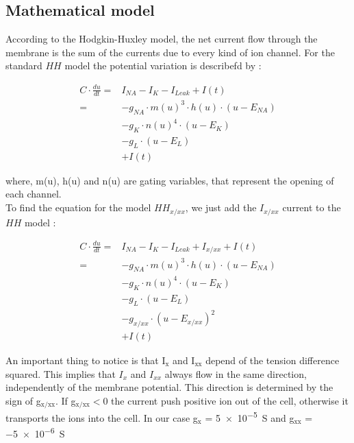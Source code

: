 \documentclass[a4paper, 10pt, conference]{ieeeconf}      %
\begin{document}
\subsection{Mathematical model}
According to the Hodgkin-Huxley model, the net current flow through the membrane is the sum of the currents due to every kind of ion channel. For the standard $HH$ model the potential variation is describefd by :

\begin{equation}
\begin{split}
C \cdot \frac{du}{dt} =& I_{NA} - I_K - I_{Leak} + I(t) \\
= &-g_{NA} \cdot m(u)^3 \cdot h(u) \cdot (u-E_{NA})\\
&-g_K \cdot n(u)^4 \cdot (u-E_K)\\
&-g_L \cdot (u-E_L)\\
&+I(t)
\end{split}
\end{equation}

where, m(u), h(u) and n(u) are gating variables, that represent the opening of each channel. \\

To find the equation for the model $HH_{x/xx}$, we just add the $I_{x/xx}$ current to the $HH$ model : 

\begin{equation}
\begin{split}
C \cdot \frac{du}{dt} =& I_{NA} - I_K - I_{Leak} + I_{x/xx} + I(t) \\
= &-g_{NA} \cdot m(u)^3 \cdot h(u) \cdot (u-E_{NA})\\
&-g_K \cdot n(u)^4 \cdot (u-E_K)\\
&-g_L \cdot (u-E_L)\\
& - g_{x/xx} \cdot (u-E_{x/xx})^2\\
& +I(t)
\end{split}
\end{equation}

An important thing to notice is that I$_\text{x}$ and I$_\text{xx}$ depend of the tension difference squared. This implies that $I_{x}$ and $I_{xx}$ always flow in the same direction, independently of the membrane potential. This direction is determined by the sign of g$_\text{x/xx}$. If g$_\text{x/xx}<0$ the current push positive ion out of the cell, otherwise it transports the ions into the cell. In our case g$_\text{x}$ = \SI{5e-5}{\siemens} and g$_\text{xx}$ = \SI{-5e-6}{\siemens} \\
\end{document}
